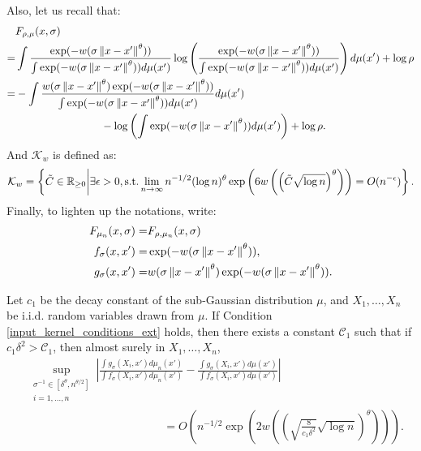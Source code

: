 Also, let us recall that:
\begin{align}
      & F_{\rho,\mu}(x,\sigma) \nonumber                                                                                                                                                                                                                    \\
    = & \int \frac{\exp(-w(\sigma\left\lVert x-x'\right\rVert^{\theta}))}{\int \exp(-w(\sigma\left\lVert x-x'\right\rVert^{\theta})) d\mu(x')} \log\left(\frac{\exp(-w(\sigma\left\lVert x-x'\right\rVert^{\theta}))}{\int \exp(-w(\sigma\left\lVert x-x'\right\rVert^{\theta})) d\mu(x')}\right)d\mu(x') + \log \rho \nonumber \\
    = & -\int \frac{w(\sigma\left\lVert x-x'\right\rVert^{\theta})\exp(-w(\sigma\left\lVert x-x'\right\rVert^{\theta}))}{\int \exp(-w(\sigma\left\lVert x-x'\right\rVert^{\theta})) d\mu(x')} d\mu(x') \nonumber                                                                                               \\
      & \qquad \qquad \qquad \qquad - \log \left(\int \exp(-w(\sigma\left\lVert x-x'\right\rVert^{\theta}))d\mu(x')\right)  + \log \rho. \nonumber
\end{align}
And $\mathcal{K}_w$ is defined as:
\begin{align}
    \mathcal{K}_w = \left\{\tilde{C} \in \mathbb{R}_{\geq 0} \bigg\rvert \exists \epsilon>0, \text{\normalfont s.t.} \lim_{n \to \infty} n^{-1/2} (\log n)^{\theta} \exp \left(6 w\left(\left(\tilde{C} \sqrt{\log n} \right)^{\theta} \right) \right) = O(n^{-\epsilon}) \right\}.
\end{align}
Finally, to lighten up the notations, write:
\begin{align} \label{tsne:uniform_convergence:notation}
    F_{\mu_n}(x,\sigma) = & F_{\rho, \mu_n}(x,\sigma) \nonumber                                \\
    f_{\sigma}(x,x') =    & \exp(-w(\sigma\left\lVert x-x'\right\rVert^{\theta})),  \nonumber                   \\
    g_{\sigma}(x,x') =    & w(\sigma\left\lVert x-x'\right\rVert^{\theta})\exp(-w(\sigma\left\lVert x-x'\right\rVert^{\theta})).
\end{align}
\begin{lemma} \label{tsne:uniform_convergence:component_lemma}
    Let $c_1$ be the decay constant of the sub-Gaussian distribution $\mu$, and $X_1,\dots,X_n$ be i.i.d. random variables drawn from $\mu$. If Condition \ref{input_kernel_conditions_ext} holds, then there exists a constant $\mathcal{C}_1$ such that if $c_1 \delta^2 > \mathcal{C}_1$, then almost surely in $X_1,\dots,X_n$,
    \begin{align}
         & \sup_{\substack{\sigma^{-1} \in [\delta^{\theta},n^{\theta/2}]                                                                                                         \\ i = 1,\dots, n}} \left|\frac{\int g_{\sigma}(X_i,x') d\mu_n(x')}{\int f_{\sigma}(X_i,x') d\mu_n(x')}-\frac{\int g_{\sigma}(X_i,x') d\mu(x')}{\int f_{\sigma}(X_i,x') d\mu(x')}\right| \nonumber \\
         & \qquad \qquad \qquad \qquad \qquad \qquad= O\left(n^{-1/2} \exp \left(2w\left(\left(\sqrt{\frac{8}{c_1\delta^2}}\sqrt{\log n} \right)^{\theta} \right) \right)\right).
    \end{align}
\end{lemma}
